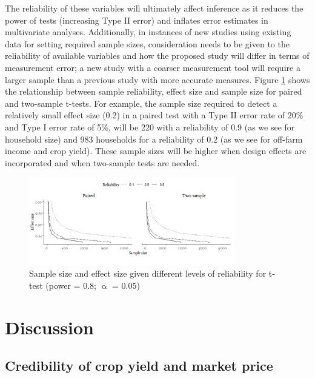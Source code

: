 The reliability of these variables will ultimately affect inference as it reduces the power of tests (increasing Type II error) and inflates error estimates in multivariate analyses. Additionally, in instances of new studies using existing data for setting required sample sizes, consideration needs to be given to the reliability of available variables and how the proposed study will differ in terms of measurement error; a new study with a coarser measurement tool will require a larger sample than a previous study with more accurate measures. Figure \ref{fig:03_5} shows the relationship between sample reliability, effect size and sample size for paired and two-sample t-tests. For example, the sample size required to detect a relatively small effect size (0.2) in a paired test with a Type II error rate of 20\% and Type I error rate of 5\%, will be 220 with a reliability of 0.9 (as we see for household size) and 983 households for a reliability of 0.2 (as we see for off-farm income and crop yield). These sample sizes will be higher when design effects are incorporated and when two-sample tests are needed.

\begin{figure}[H]
  \includegraphics[width=0.8\textwidth]{figs_03/image5.png}
  \captionsetup{singlelinecheck = off, justification=justified}
  \caption{Sample size and effect size given different levels of reliability for t-test (power = 0.8; ${\upalpha}$ = 0.05)}
  \label{fig:03_5}
\end{figure}


\section{Discussion}

\subsection{Credibility of crop yield and market price}

